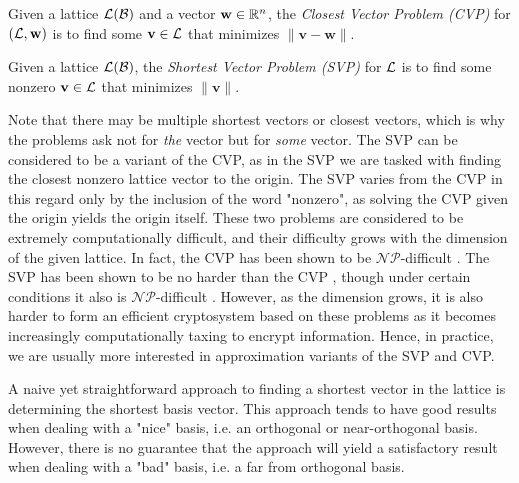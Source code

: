 \documentclass[a4paper,12pt]{article}
\begin{document}
\begin{defn}\label{CVP}
Given a lattice $\mathcal{L}(\mathcal{B})$ and a vector $\mathbf{w} \in \mathbb{R}^n$, the \textit{Closest Vector Problem (CVP)} for $(\mathcal{L}, \mathbf{w})$ is to find some $\mathbf{v} \in \mathcal{L}$ that minimizes $\| \mathbf{v} - \mathbf{w} \|$. 
\end{defn}

\begin{defn}\label{SVP}
Given a lattice $\mathcal{L}(\mathcal{B})$, the \textit{Shortest Vector Problem (SVP)} for $\mathcal{L}$ is to find some nonzero $\mathbf{v} \in \mathcal{L}$ that minimizes $\| \mathbf{v} \|$.
\end{defn}

Note that there may be multiple shortest vectors or closest vectors, which is why the problems ask not for \textit{the} vector but for \textit{some} vector. The SVP can be considered to be a variant of the CVP, as in the SVP we are tasked with finding the closest nonzero lattice vector to the origin. The SVP varies from the CVP in this regard only by the inclusion of the word "nonzero", as solving the CVP given the origin yields the origin itself. These two problems are considered to be extremely computationally difficult, and their difficulty grows with the dimension of the given lattice. In fact, the CVP has been shown to be $\mathcal{NP}$-difficult \cite{Dinur}. The SVP has been shown to be no harder than the CVP \cite{Goldreich}, though under certain conditions it also is $\mathcal{NP}$-difficult \cite{AjtaiSVP}. However, as the dimension grows, it is also harder to form an efficient cryptosystem based on these problems as it becomes increasingly computationally taxing to encrypt information. Hence, in practice, we are usually more interested in approximation variants of the SVP and CVP. 

A naive yet straightforward approach to finding a shortest vector in the lattice is determining the shortest basis vector. This approach tends to have good results when dealing with a "nice" basis, i.e. an orthogonal or near-orthogonal basis. However, there is no guarantee that the approach will yield a satisfactory result when dealing with a "bad" basis, i.e. a far from orthogonal basis.
\end{document}
